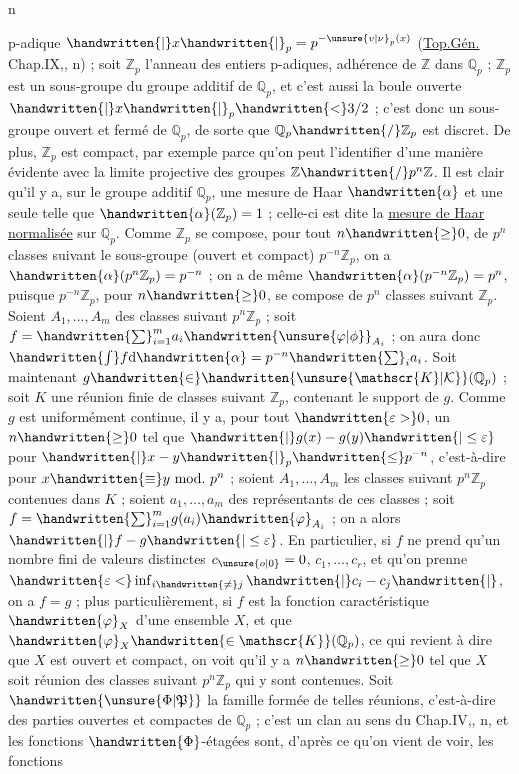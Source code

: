 n

p-adique $\handwritten{|}x\handwritten{|}_{p}=p^{-\unsure{v|\nu}_{p}(x)}$ (\uline{Top.Gén.} Chap.IX,, n) ; soit $\mathbb{Z}_{p}$ l'anneau des entiers p-adiques, adhérence de $\mathbb{Z}$ dans $\mathbb{Q}_{p}$ ; $\mathbb{Z}_{p}$ est un sous-groupe du groupe additif de $\mathbb{Q}_{p}$, et c'est aussi la boule ouverte $\handwritten{|}x\handwritten{|}_{p}\handwritten{<}3/2$ ; c'est donc un sous-groupe ouvert et fermé de $\mathbb{Q}_{p}$, de sorte que $\mathbb{Q}_{p}\handwritten{/}\mathbb{Z}_{p}$ est discret. De plus, $\mathbb{Z}_{p}$ est compact, par exemple parce qu'on peut l'identifier d'une manière évidente avec la limite projective des groupes $\mathbb{Z}\handwritten{/}p^{n}\mathbb{Z}$. Il est clair qu'il y a, sur le groupe additif $\mathbb{Q}_{p}$, une mesure de Haar $\handwritten{\alpha}$ et une seule telle que $\handwritten{\alpha}(\mathbb{Z}_{p})=1$ ; celle-ci est dite la \uline{mesure de Haar normalisée} sur $\mathbb{Q}_{p}$. Comme $\mathbb{Z}_{p}$ se compose, pour tout $n\handwritten{\geq}0$, de $p^{n}$ classes suivant le sous-groupe (ouvert et compact) $p^{-n}\mathbb{Z}_{p}$, on a $\handwritten{\alpha}(p^{n}\mathbb{Z}_{p})=p^{-n}$ ; on a de même $\handwritten{\alpha}(p^{-n}\mathbb{Z}_{p})=p^{n}$, puisque $p^{-n}\mathbb{Z}_{p}$, pour $n\handwritten{\geq}0$, se compose de $p^{n}$ classes suivant $\mathbb{Z}_{p}$. Soient $A_{1},\ldots,A_{m}$ des classes suivant $p^{n}\mathbb{Z}_{p}$ ; soit $f=\handwritten{\sum}_{i=1}^{m}a_{i}\handwritten{\unsure{\varphi|\phi}}_{A_{i}}$ ; on aura donc $\handwritten{\int}f\mathrm{d}\handwritten{\alpha}=p^{-n}\handwritten{\sum}_{i}a_{i}$. Soit maintenant $g\handwritten{\in}\handwritten{\unsure{\mathscr{K}|\mathcal{K}}}(\mathbb{Q}_{p})$ ; soit $K$ une réunion finie de classes suivant $\mathbb{Z}_{p}$, contenant le support de $g$. Comme $g$ est uniformément continue, il y a, pour tout $\handwritten{\varepsilon> }0$, un $n\handwritten{\geq}0$ tel que $\handwritten{|}g(x)-g(y)\handwritten{|\leq\varepsilon}$ pour $\handwritten{|}x-y\handwritten{|}_{p}\handwritten{\leq}p^{-n}$, c'est-à-dire pour $x\handwritten{\equiv}y\ \mathrm{mod.}\ p^{n}$ ; soient $A_{1},\ldots,A_{m}$ les classes suivant $p^{n}\mathbb{Z}_{p}$ contenues dans $K$ ; soient $a_{1},\ldots,a_{m}$ des représentants de ces classes ; soit $f=\handwritten{\sum}_{i=1}^{m}g(a_{i})\handwritten{\varphi}_{A_{i}}$ ; on a alors $\handwritten{|}f-g\handwritten{|\leq\varepsilon}$. En particulier, si $f$ ne prend qu'un nombre fini de valeurs distinctes $c_{\unsure{o|0}}=0$, $c_{1},\ldots,c_{r}$, et qu'on prenne $\handwritten{\varepsilon<}\inf_{i\handwritten{\ne}j}\handwritten{|}c_{i}-c_{j}\handwritten{|}$, on a $f=g$ ; plus particulièrement, si $f$ est la fonction caractéristique $\handwritten{\varphi}_{X}$ d'une ensemble $X$, et que $\handwritten{\varphi}_{X}\handwritten{\in\mathscr{K}}(\mathbb{Q}_{p})$, ce qui revient à dire que $X$ est ouvert et compact, on voit qu'il y a $n\handwritten{\geq}0$ tel que $X$ soit réunion des classes suivant $p^{n}\mathbb{Z}_{p}$ qui y sont contenues. Soit $\handwritten{\unsure{\Phi|\mathfrak{P}}}$ la famille formée de telles réunions, c'est-à-dire des parties ouvertes et compactes de $\mathbb{Q}_{p}$ ; c'est un clan au sens du Chap.IV,, n, et les fonctions $\handwritten{\Phi}$-étagées sont, d'après ce qu'on vient de voir, les fonctions
